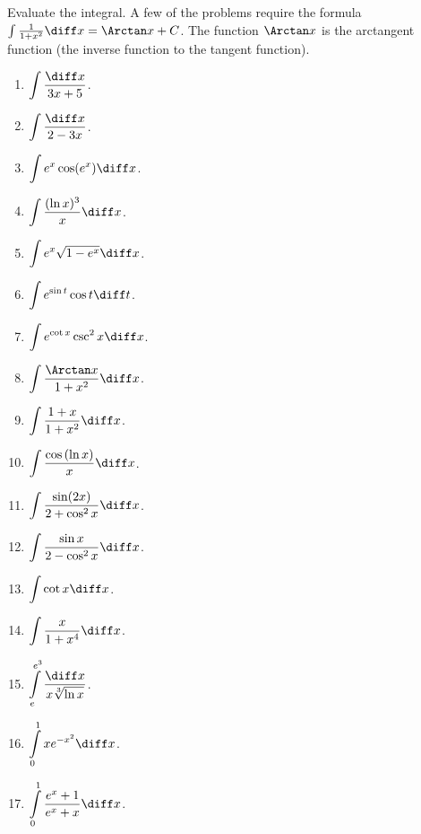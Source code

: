 Evaluate the integral. A few of the problems require the formula $\int \frac{1}{1+x^2}\diff x=\Arctan x+C $. The function $\Arctan x$ is the arctangent function (the inverse function to the tangent function).
\begin{multicols}{3}
\begin{enumerate}
\item $\displaystyle\int \frac{\diff x}{3x+5} $.
\item $\displaystyle\int \frac{\diff x}{2-3x}$.
\item $\displaystyle\int e^x\cos (e^x) \diff x$.
\item $\displaystyle\int \frac{(\ln x)^3}{x} \diff x$.
\item $\displaystyle\int e^x\sqrt{1-e^x} \diff x$.
\item $\displaystyle\int e^{\sin t }\cos t \diff t$.
\item $\displaystyle\int e^{\cot x}\csc^2x \diff x$.
\item $\displaystyle\int \frac{\Arctan x}{1+x^2} \diff x$. 
\item $\displaystyle\int \frac{1+x}{1+x^2} \diff x$. 
\item $\displaystyle\int \frac{\cos \left(\ln x\right)}{x} \diff x$.
\item $\displaystyle\int \frac{\sin (2x)}{2+\cos^2x}\diff x$.
\item $\displaystyle\int \frac{\sin x}{2-\cos^2 x} \diff x$.
\item $\displaystyle\int \cot x \diff x$.
\item $\displaystyle\int \frac{x}{1+x^4}\diff x$.
\item $\displaystyle\int\limits_{e}^{e^3}\frac{\diff x}{x \sqrt[3]{\ln x}} $.
\item $\displaystyle\int\limits_{0}^{1}xe^{-x^2} \diff x$.
\item $\displaystyle\int\limits_{0}^{1}\frac{e^x+1}{e^x+x} \diff x$.
\end{enumerate}
\end{multicols}